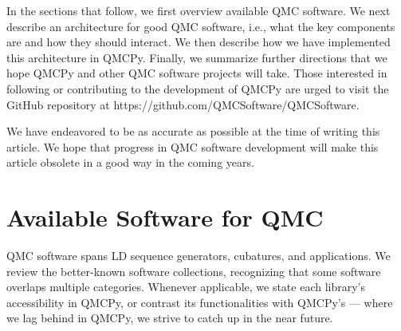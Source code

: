 \documentclass[graybox]{svmult}
\begin{document}
In the sections that follow, we first overview available QMC software.  We next describe an architecture for good QMC software, i.e., what the key components are and how they should interact.  We then describe how we have implemented this architecture in QMCPy.  Finally, we summarize further directions that we hope QMCPy and other QMC software projects will take.  Those interested in following or contributing to the development of QMCPy are urged to visit the GitHub repository at https://github.com/QMCSoftware/QMCSoftware.


We have endeavored to be as accurate as possible at the time of writing this article.  We hope that progress in QMC software development will make this article obsolete in a good way in the coming years.

\section{Available Software for QMC} \label{sec:available} 
QMC software spans  LD sequence generators, cubatures, and applications.  We review the better-known software collections, recognizing that some software overlaps multiple categories. Whenever applicable, we state each library's accessibility in QMCPy, or contrast its functionalities with QMCPy's --- where we lag behind in QMCPy, we strive to catch up in the near future.
\end{document}
